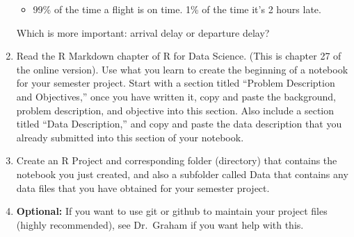 \documentclass[12pt]{article}
\begin{document}
\begin{enumerate}
\begin{itemize}
          \item 99\% of the time a flight is on time. 1\% of the time it's 2 hours late.
       \end{itemize}
Which is more important: arrival delay or departure delay? 
\item Read the R Markdown chapter of R for Data Science. (This is chapter 27 of the online version). Use what you learn to create the beginning of a notebook for your semester project. Start with a section titled ``Problem Description and Objectives,'' once you have written it, copy and paste the  background, problem description, and objective into this section. Also include a section titled ``Data Description,'' and copy and paste the data description that you already submitted into this section of your notebook.  
\item Create an R Project and corresponding folder (directory) that contains the notebook you just created, and also a subfolder called Data that contains any data files that you have obtained for your semester project.  
\item {\bf Optional:} If you want to use git or github to maintain your project files (highly recommended), see Dr.\ Graham if you want help with this.   
  \end{enumerate}
\end{document}
